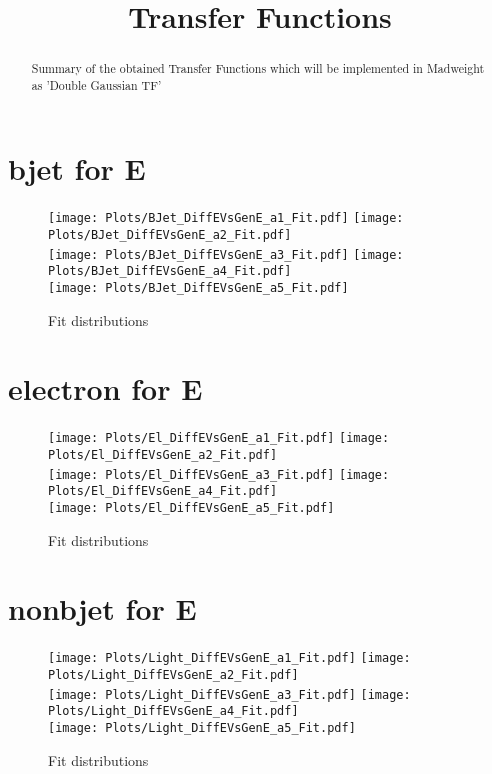 \documentclass[a4paper,10pt]{article}
\title{Transfer Functions}
\begin{document}
 
\maketitle 
\begin{abstract} 
 Summary of the obtained Transfer Functions which will be implemented in Madweight as 'Double Gaussian TF' \\
\end{abstract} 

\newpage 
\section{bjet for E}
 \begin{figure}[h!b] 
  \texttt{[image: Plots/BJet\_DiffEVsGenE\_a1\_Fit.pdf]} 
  \texttt{[image: Plots/BJet\_DiffEVsGenE\_a2\_Fit.pdf]} \\ 
  \texttt{[image: Plots/BJet\_DiffEVsGenE\_a3\_Fit.pdf]} 
  \texttt{[image: Plots/BJet\_DiffEVsGenE\_a4\_Fit.pdf]} \\ 
  \texttt{[image: Plots/BJet\_DiffEVsGenE\_a5\_Fit.pdf]} 
 \caption{Fit distributions} 
\end{figure} 

\newpage 
\section{electron for E}
 \begin{figure}[h!b] 
  \texttt{[image: Plots/El\_DiffEVsGenE\_a1\_Fit.pdf]} 
  \texttt{[image: Plots/El\_DiffEVsGenE\_a2\_Fit.pdf]} \\ 
  \texttt{[image: Plots/El\_DiffEVsGenE\_a3\_Fit.pdf]} 
  \texttt{[image: Plots/El\_DiffEVsGenE\_a4\_Fit.pdf]} \\ 
  \texttt{[image: Plots/El\_DiffEVsGenE\_a5\_Fit.pdf]} 
 \caption{Fit distributions} 
\end{figure} 

\newpage 
\section{nonbjet for E}
 \begin{figure}[h!b] 
  \texttt{[image: Plots/Light\_DiffEVsGenE\_a1\_Fit.pdf]} 
  \texttt{[image: Plots/Light\_DiffEVsGenE\_a2\_Fit.pdf]} \\ 
  \texttt{[image: Plots/Light\_DiffEVsGenE\_a3\_Fit.pdf]} 
  \texttt{[image: Plots/Light\_DiffEVsGenE\_a4\_Fit.pdf]} \\ 
  \texttt{[image: Plots/Light\_DiffEVsGenE\_a5\_Fit.pdf]} 
 \caption{Fit distributions} 
\end{figure} 
\end{document}
